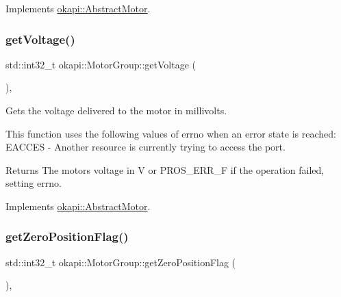 Implements \mbox{\hyperlink{classokapi_1_1AbstractMotor_a955818baa689b279b36dda6a74f15d4e}{okapi\+::\+Abstract\+Motor}}.

\mbox{\label{classokapi_1_1MotorGroup_a399d4a16683c5498483f1f1e5e6307b5}} 
\subsubsection{\texorpdfstring{getVoltage()}{getVoltage()}}
{\footnotesize\ttfamily std\+::int32\+\_\+t okapi\+::\+Motor\+Group\+::get\+Voltage (\begin{DoxyParamCaption}{ }\end{DoxyParamCaption})\hspace{0.3cm}{\ttfamily [override]}, {\ttfamily [virtual]}}

Gets the voltage delivered to the motor in millivolts.

This function uses the following values of errno when an error state is reached\+: E\+A\+C\+C\+ES -\/ Another resource is currently trying to access the port.

\begin{DoxyReturn}{Returns}
The motor\textquotesingle{}s voltage in V or {\ttfamily P\+R\+O\+S\+\_\+\+E\+R\+R\+\_\+F} if the operation failed, setting errno. 
\end{DoxyReturn}


Implements \mbox{\hyperlink{classokapi_1_1AbstractMotor_a855b35b508e90074f21662b06ad2a0c8}{okapi\+::\+Abstract\+Motor}}.

\mbox{\label{classokapi_1_1MotorGroup_a94be8c4591e65b268dd4f7357fdf4b50}} 
\subsubsection{\texorpdfstring{getZeroPositionFlag()}{getZeroPositionFlag()}}
{\footnotesize\ttfamily std\+::int32\+\_\+t okapi\+::\+Motor\+Group\+::get\+Zero\+Position\+Flag (\begin{DoxyParamCaption}{ }\end{DoxyParamCaption})\hspace{0.3cm}{\ttfamily [override]}, {\ttfamily [virtual]}}

